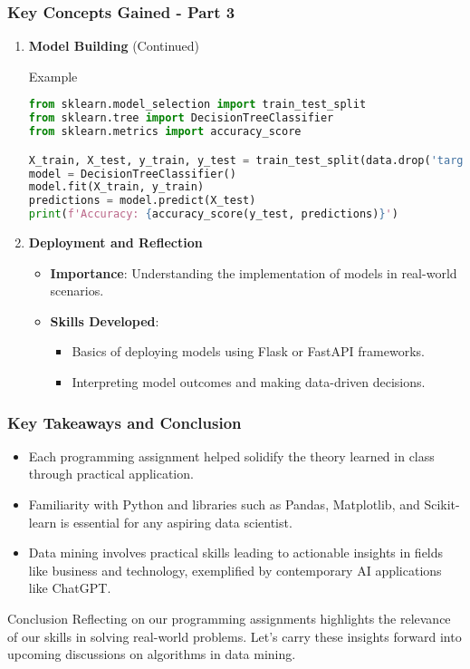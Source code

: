 \documentclass[aspectratio=169]{beamer}
\begin{document}
\begin{frame}[fragile]
    \frametitle{Key Concepts Gained - Part 3}
    \begin{enumerate}[resume]
        \item \textbf{Model Building} (Continued)
        \begin{block}{Example}
        \begin{lstlisting}[language=Python]
from sklearn.model_selection import train_test_split
from sklearn.tree import DecisionTreeClassifier
from sklearn.metrics import accuracy_score

X_train, X_test, y_train, y_test = train_test_split(data.drop('target', axis=1), data['target'], test_size=0.2)
model = DecisionTreeClassifier()
model.fit(X_train, y_train)
predictions = model.predict(X_test)
print(f'Accuracy: {accuracy_score(y_test, predictions)}')
        \end{lstlisting}
        \end{block}
        
        \item \textbf{Deployment and Reflection}
        \begin{itemize}
            \item \textbf{Importance}: Understanding the implementation of models in real-world scenarios.
            \item \textbf{Skills Developed}:
            \begin{itemize}
                \item Basics of deploying models using Flask or FastAPI frameworks.
                \item Interpreting model outcomes and making data-driven decisions.
            \end{itemize}
        \end{itemize}
    \end{enumerate}
\end{frame}

\begin{frame}
    \frametitle{Key Takeaways and Conclusion}
    \begin{itemize}
        \item Each programming assignment helped solidify the theory learned in class through practical application.
        \item Familiarity with Python and libraries such as Pandas, Matplotlib, and Scikit-learn is essential for any aspiring data scientist.
        \item Data mining involves practical skills leading to actionable insights in fields like business and technology, exemplified by contemporary AI applications like ChatGPT.
    \end{itemize}
    
    \begin{block}{Conclusion}
        Reflecting on our programming assignments highlights the relevance of our skills in solving real-world problems. Let’s carry these insights forward into upcoming discussions on algorithms in data mining.
    \end{block}
\end{frame}
\end{document}
